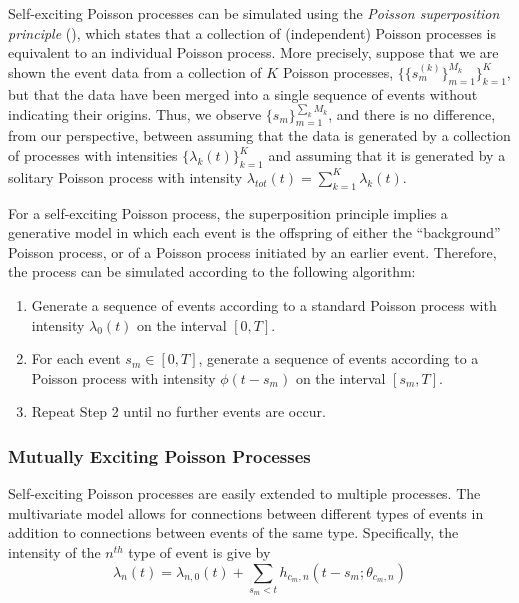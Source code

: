Self-exciting Poisson processes can be simulated using the \textit{Poisson superposition principle} (\cite{Kingman1993}), which states that a collection of (independent) Poisson processes is equivalent to an individual Poisson process. More precisely, suppose that we are shown the event data from a collection of $K$ Poisson processes, $\{ \{ s_m^{(k)} \}_{m=1}^{M_k} \}_{k=1}^K$, but that the data have been merged into a single sequence of events without indicating their origins. Thus, we observe $\{ s_m \}_{m=1}^{\sum_k M_k}$, and there is no difference, from our perspective, between assuming that the data is generated by a collection of processes with intensities $\{\lambda_k(t)\}_{k=1}^K$ and assuming that it is generated by a solitary Poisson process with intensity $\lambda_{tot}(t) = \sum_{k=1}^K \lambda_k(t)$.

For a self-exciting Poisson process, the superposition principle implies a generative model in which each event is the offspring of either the ``background'' Poisson process, or of a Poisson process initiated by an earlier event. Therefore, the process can be simulated according to the following algorithm:
\begin{enumerate}
	\item Generate a sequence of events according to a standard Poisson process with intensity $\lambda_0(t)$ on the interval $[0,T]$.
	\item For each event $s_m \in [0, T]$, generate a sequence of events according to a Poisson process with intensity $\phi(t - s_m)$ on the interval $[s_m, T]$.
	\item Repeat Step 2 until no further events are occur.
\end{enumerate}

\subsubsection{Mutually Exciting Poisson Processes}
Self-exciting Poisson processes are easily extended to multiple processes. The multivariate model allows for connections between different types of events in addition to connections between events of the same type. Specifically, the intensity of the $n^{th}$ type of event is give by
\begin{equation} \label{eq:hawkes-intensity}
	\lambda_{n}(t) = \lambda_{n, 0}(t) + \sum_{s_m < t} h_{c_m, n}(t - s_m; \theta_{c_m, n})
\end{equation}

